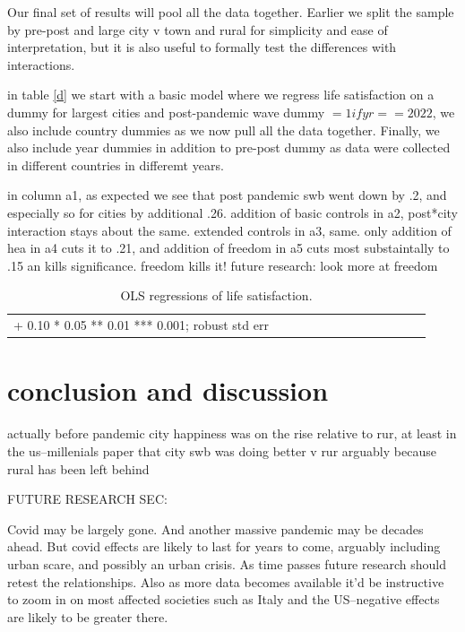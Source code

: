 \documentclass[10pt, letterpaper]{article}
\begin{document}
\begin{spacing}{1.4}
Our final set of results will pool all the data together. Earlier we split the
sample by pre-post and large city v town and rural for simplicity and ease of
interpretation, but it is also useful to formally test the differences with
interactions. 

in table \ref{d} we start with a basic model where we regress life satisfaction
on a dummy for largest cities and post-pandemic wave dummy $=1 if yr==2022$, we
also include country dummies as we now pull all the data together. Finally, we
also include year dummies in addition to pre-post dummy as data were collected
in different countries in differemt years.

in column a1, as expected we see that post pandemic swb went down by .2, and
especially so for cities  by additional .26. addition of basic controls in a2,
post*city interaction stays about the same. extended controls in a3, same. only
addition of hea in a4 cuts it to .21, and addition of freedom in a5 cuts most
substaintally to .15 an kills significance. freedom kills it! future research: look more at freedom

\begin{spacing}{.9} \begin{table}[H]\centering   \begin{scriptsize} \begin{tabular}{p{1.8in}p{.5in}p{.5in}p{.5in}p{.5in}p{.5in}p{.5in}p{.5in}p{.5in}p{.5in}p{.5 in}p{.5in}p{.5 in}}\hline  \hline + 0.10 * 0.05 ** 0.01 *** 0.001; robust std err \end{tabular}\end{scriptsize}\caption{\label{c}OLS regressions of life satisfaction.}\end{table} \end{spacing}

\section{conclusion and discussion}

actually before pandemic city happiness was on the rise relative to rur, at
least in the us--millenials paper that city swb was doing better v rur arguably
because rural has been left behind

FUTURE RESEARCH SEC:

Covid may be largely gone. And another massive pandemic may be decades ahead. But covid effects are likely to last for years to come, arguably including urban scare, and possibly an urban crisis. As time passes future research should retest the relationships. Also as more data becomes available it'd be instructive to zoom in on most affected societies such as Italy and the US--negative effects are likely to be greater there.




\end{spacing}
\end{document}
